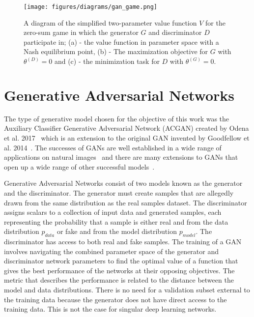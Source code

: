 \documentclass[twocolumn]{article}
\numberwithin{equation}{section}
\begin{document}
\begin{figure}%
\texttt{[image: figures/diagrams/gan\_game.png]}
\centering
\caption{A diagram of the simplified two-parameter value function $V$ for the zero-sum game in which the generator $G$ and 
discriminator $D$ participate in; (a) - the value function in parameter space with a Nash equilibrium point, (b) - The 
maximization objective for $G$ with $\theta^{(D)}=0$ and (c) - the minimization task for $D$ with $\theta^{(G)}=0$.}
\label{fig:gan_game}
\end{figure}


\section{Generative Adversarial Networks}\label{sec:gans}

The type of generative model chosen for the objective of this work was the Auxiliary Classifier Generative Adversarial 
Network (ACGAN) created by Odena et al. 2017~\cite{acgan} which is an extension to the original GAN invented by Goodfellow 
et al. 2014~\cite{gf_gan}. The successes of GANs are well established in a wide range of applications on natural 
images~\cite{wgan, karrasgan, largegan} and there are many extensions to GANs that open up a wide range of other successful models~\cite{pix2pix, hiresgan, lapgan}. 

Generative Adversarial Networks consist of two models known as the generator and the discriminator. The generator must 
create samples that are allegedly drawn from the same distribution as the real samples dataset. The discriminator assigns 
scalars to a collection of input data and generated samples, each representing the probability that a sample is either real 
and from the data distribution $p_{data}$ or fake and from the model distribution  $p_{model}$. The discriminator has 
access to both real and fake samples. The training of a GAN involves navigating the combined parameter space of the 
generator and discriminator network parameters to find the optimal value of a function that gives the best performance of
the networks at their opposing objectives. The metric that describes the performance is related to the distance between 
the model and data distributions. There is no need for a validation subset external to the training data because the 
generator does not have direct access to the training data. This is not the case for singular deep learning networks.
\end{document}
